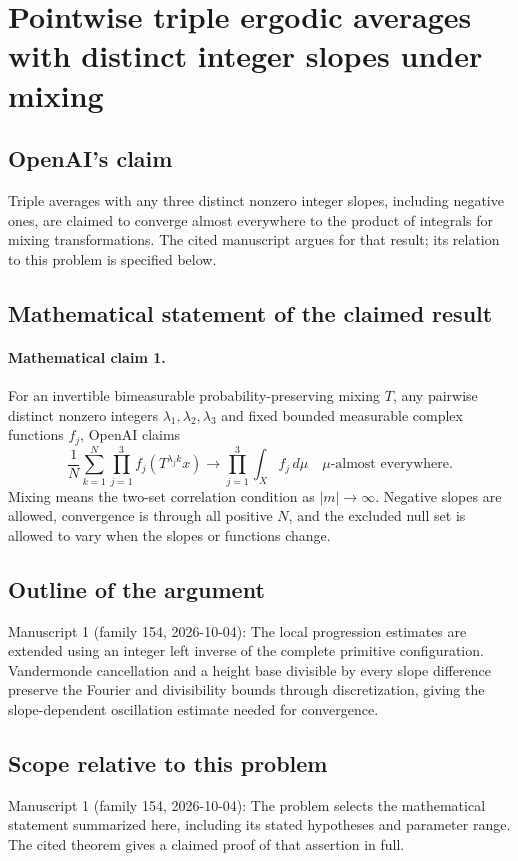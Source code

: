 \documentclass[11pt]{article}
\begin{document}
\section*{Pointwise triple ergodic averages with distinct integer slopes under mixing}

\subsection{OpenAI's claim}
Triple averages with any three distinct nonzero integer slopes, including negative ones, are claimed to converge almost everywhere to the product of integrals for mixing transformations. The cited manuscript argues for that result; its relation to this problem is specified below.

\subsection{Mathematical statement of the claimed result}
\paragraph{Mathematical claim 1.} For an invertible bimeasurable probability-preserving mixing $T$, any pairwise distinct nonzero integers $\lambda_1,\lambda_2,\lambda_3$ and fixed bounded measurable complex functions $f_j$, OpenAI claims
\[
\frac1N\sum_{k=1}^N\prod_{j=1}^3 f_j(T^{\lambda_j k}x)
\longrightarrow\prod_{j=1}^3\int_X f_j\,d\mu
\quad\mu\text{-almost everywhere}.
\]
Mixing means the two-set correlation condition as $|m|\to\infty$. Negative slopes are allowed, convergence is through all positive $N$, and the excluded null set is allowed to vary when the slopes or functions change.

\subsection{Outline of the argument}
Manuscript 1 (family 154, 2026-10-04): The local progression estimates are extended using an integer left inverse of the complete primitive configuration. Vandermonde cancellation and a height base divisible by every slope difference preserve the Fourier and divisibility bounds through discretization, giving the slope-dependent oscillation estimate needed for convergence.

\subsection{Scope relative to this problem}
Manuscript 1 (family 154, 2026-10-04): The problem selects the mathematical statement summarized here, including its stated hypotheses and parameter range. The cited theorem gives a claimed proof of that assertion in full.
\end{document}
